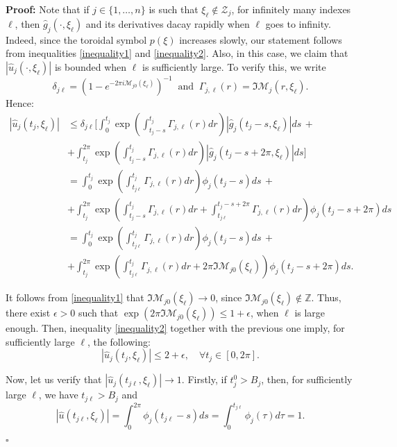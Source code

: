 \documentclass[12pt]{elsarticle}
\numberwithin{equation}{section}
\newenvironment{proof}[1][\noindent \textbf{Proof: }]{#1}{ \hfill $\square$ \vspace{2mm}}
\begin{document}
\begin{proof}
	Note that if $j\in\{1,\ldots,n\}$ is such that $\xi_\ell\notin \mathcal{Z}_j$, for infinitely many indexes $\ell$, then $\widehat{g}_j(\cdot,\xi_\ell)$ and its derivatives dacay rapidly when $\ell$ goes to infinity. Indeed, since the toroidal symbol $p(\xi)$ increases slowly, our statement follows from inequalities \eqref{inequality1} and \eqref{inequality2}. Also, in this case,
	we claim that  $|\widehat{u}_j(\cdot,\xi_\ell)|$ is bounded when $\ell$ is sufficiently large. To verify this, we write  
	$$
	\delta_{j\ell}=(1-e^{-2\pi i\mathcal{M}_{j0}(\xi_\ell)})^{-1}
	\ \textrm{ and } \
	\Gamma_{j,\ell}(r) =\Im\mathcal{M}_j(r,\xi_\ell).
	$$
 Hence:
\begin{align*}
|\widehat{u}_j(t_j,\xi_\ell)| & \leq 
\delta_{j\ell} \Big[ \int_{0}^{t_j}\exp\left(\int_{t_j-s}^{t_j}\Gamma_{j,\ell}(r) dr\right)|\widehat{g}_j(t_j-s,\xi_\ell) |ds \, + \\ 
& + \int_{t_j}^{2\pi}\exp\left(\int_{t_j-s}^{t_j}\Gamma_{j,\ell}(r) dr \right)|\widehat{g}_j(t_j-s+2\pi,\xi_\ell) | ds\Big] \\ 
& =  \int_{0}^{t_j}\exp\left(\int_{t_{j\ell}}^{t_j} \Gamma_{j,\ell}(r) dr\right)\phi_j(t_j-s) ds \, + \\ 
& +\int_{t_j}^{2\pi}\exp\left(\int_{t_j-s}^{t_j}\Gamma_{j,\ell}(r) dr +\int^{t_j-s+2\pi}_{t_{j\ell}}\Gamma_{j,\ell}(r) dr\right) 
\phi_j(t_j-s+2\pi) ds  \\
& =  \int_{0}^{t_j}
\exp\left(\int^{t_j}_{t_{j\ell}}\Gamma_{j,\ell}(r) dr\right)\phi_j(t_j-s) ds \, + \\ 
& + \int_{t_j}^{2\pi}\exp\left(\int^{t_j}_{t_{j\ell}}\Gamma_{j,\ell}(r) dr+2\pi \Im\mathcal{M}_{j0}(\xi_\ell)\right)\phi_j(t_j-s+2\pi) ds .
\end{align*}
	
	
	
It follows from \eqref{inequality1} that $\Im\mathcal{M}_{j0}(\xi_\ell)\rightarrow 0$, since $\Im\mathcal{M}_{j0}(\xi_\ell)\notin \mathbb{Z}$. Thus, there exist $\epsilon>0$ such that $\exp({2\pi \Im\mathcal{M}_{j0}(\xi_\ell) })\leq 1+\epsilon$, when $\ell$ is large enough. Then,  inequality  \eqref{inequality2} together with the  previous one imply, for sufficiently large  $\ell$, the following:
$$
|\widehat{u}_j(t_j,\xi_\ell)|\leq 2+\epsilon,\quad \forall t_j\in[0,2\pi] .
$$
	
	Now, let us  verify that  $|\widehat{u}_j(t_{j\ell},\xi_{\ell})|\rightarrow 1$. Firstly, 
	if $t_{j}^{0}> B_j$, then, for sufficiently large $\ell$, we have $t_{j\ell}>B_j$   and 
	$$
	|\widehat{u}(t_{j\ell},\xi_\ell)|
	=\int_{0}^{2\pi}\phi_j(t_{j\ell}-s)ds=\int_{0}^{t_{j\ell}}\phi_j(\tau)d\tau= 1.
	$$ 
	

\end{proof}
\end{document}
